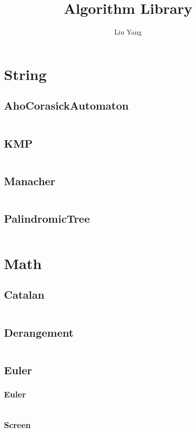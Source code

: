 \documentclass[a4paper,11pt]{article}
\author{Liu Yang}
\title{Algorithm Library}
\begin{document}
 
\maketitle
\newpage
\tableofcontents
\newpage

\section{String}
\subsection{AhoCorasickAutomaton}
\inputminted[breaklines]{c++}{01++String/+AhoCorasickAutomaton.cpp}
\subsection{KMP}
\inputminted[breaklines]{c++}{01++String/+KMP.cpp}
\subsection{Manacher}
\inputminted[breaklines]{c++}{01++String/+Manacher.cpp}
\subsection{PalindromicTree}
\inputminted[breaklines]{c++}{01++String/+PalindromicTree.cpp}

\newpage
\section{Math}
\subsection{Catalan}
\inputminted[breaklines]{c++}{02++Math/+Catalan.cpp}
\subsection{Derangement}
\inputminted[breaklines]{c++}{02++Math/+Derangement.cpp}
\subsection{Euler}
\subsubsection{Euler}
\inputminted[breaklines]{c++}{02++Math/+Euler/+Euler.cpp}
\subsubsection{Screen}
\inputminted[breaklines]{c++}{02++Math/+Euler/+Screen.cpp}
\end{document}
